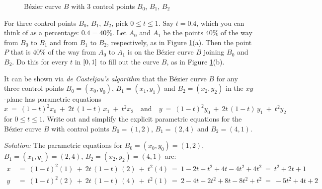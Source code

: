 \begin{exmp}
\begin{figure}[ht]
{}
 \caption[]{\enskip B\'{e}zier curve $B$ with 3 control points $B_0$, $B_1$, $B_2$}
 \label{fig:bezier}
\end{figure}

For three control points $B_0$, $B_1$, $B_2$, pick $0 \le t \le 1$. Say $t=0.4$,
which you can think of as a percentage: $0.4 = 40\%$. Let $A_0$ and $A_1$ be the
points $40\%$ of the way from $B_0$ to $B_1$ and from $B_1$ to $B_2$,
respectively, as in Figure \ref{fig:bezier}(a). Then the point $P$ that is
$40\%$ of the way from $A_0$ to $A_1$ is on the B\'{e}zier curve $B$ joining
$B_0$ and $B_2$. Do this for every $t$ in $\lbrack 0,1 \rbrack$ to fill out the curve
$B$, as in Figure \ref{fig:bezier}(b).

It can be shown via \emph{de Casteljau's algorithm} that
the B\'{e}zier curve $B$ for any three control points $B_0=(x_0,y_0)$,
$B_1=(x_1,y_1)$ and $B_2=(x_2,y_2)$ in the $xy$-plane has parametric equations
\begin{equation}\label{eqn:bezier3}
x ~=~ (1-t)^2 x_0 ~+~ 2t\,(1-t)\,x_1 ~+~ t^2 x_2 \quad\text{and}\quad
y ~=~ (1-t)^2 y_0 ~+~ 2t\,(1-t)\,y_1 ~+~ t^2 y_2
\end{equation}
for $0 \le t \le 1$. Write out and simplify the explicit parametric equations
for the B\'{e}zier curve $B$ with control points $B_0=(1,2)$, $B_1=(2,4)$ and
$B_2=(4,1)$.\vspace{1mm}
\par\noindent\emph{Solution:} The parametric equations for
$B_0=(x_0,y_0)=(1,2)$, $B_1=(x_1,y_1)=(2,4)$, $B_2=(x_2,y_2)=(4,1)$ are:
\begin{align*}
x ~&=~ (1-t)^2 (1) ~+~ 2t\,(1-t)\,(2) ~+~ t^2 (4) ~=~
1 - 2t + t^2 + 4t - 4t^2 + 4t^2 ~=~ t^2 + 2t + 1\\
y ~&=~ (1-t)^2 (2) ~+~ 2t\,(1-t)\,(4) ~+~ t^2 (1) ~=~
2 - 4t + 2t^2 + 8t - 8t^2 + t^2 ~=~ -5t^2 + 4t + 2
\end{align*}


\end{exmp}
